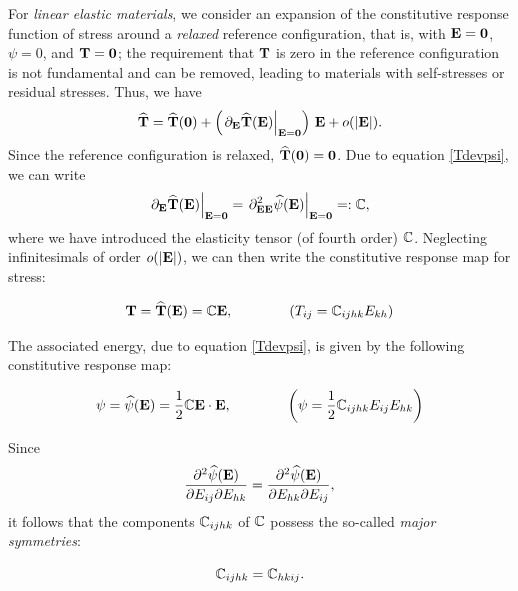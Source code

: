 For \textit{linear elastic materials}, we consider an expansion of the constitutive response function of stress around a \textit{relaxed} reference configuration, that is, with $\mathbf{E} = \mathbf{0}$, $\psi = 0$, and $\mathbf{T} = \mathbf{0}$; the requirement that $\mathbf{T}$ is zero in the reference configuration is not fundamental and can be removed, leading to materials with self-stresses or residual stresses. Thus, we have
\begin{equation}
	\widehat{\mathbf{T}} = \widehat{\mathbf{T}}(\mathbf{0}) + \left(\left.\partial_{\mathbf{E}} \widehat{\mathbf{T}}(\mathbf{E})\right|_{\mathbf{E} = \mathbf{0}}\right)\,\mathbf{E} + o(|\mathbf{E}|).
\end{equation}
Since the reference configuration is relaxed, $\widehat{\mathbf{T}}(\mathbf{0}) = \mathbf{0}$. Due to equation \eqref{Tdevpsi}, we can write
\begin{equation}
	\left.\partial_{\mathbf{E}} \widehat{\mathbf{T}}(\mathbf{E})\right|_{\mathbf{E} = \mathbf{0}} = \left.\partial^2_{\mathbf{E} \mathbf{E}} \widehat{\psi}(\mathbf{E})\right|_{\mathbf{E} = \mathbf{0}} =: \mathbb{C},
\end{equation}
where we have introduced the elasticity tensor (of fourth order) $\mathbb{C}$. Neglecting infinitesimals of order $o(|\mathbf{E}|)$, we can then write the constitutive response map for stress:
\begin{definition}
	\begin{equation}
		\mathbf{T} = \widehat{\mathbf{T}}(\mathbf{E}) = \mathbb{C} \mathbf{E}, \qquad \qquad (T_{ij} = \mathbb{C}_{ijhk} E_{kh})
	\end{equation}
\end{definition}
The associated energy, due to equation \eqref{Tdevpsi}, is given by the following constitutive response map:
\begin{definition}
	\begin{equation}
		\psi = \widehat{\psi}(\mathbf{E}) = \frac{1}{2} \mathbb{C} \mathbf{E} \cdot \mathbf{E}, \qquad \qquad \left(\psi = \frac{1}{2} \mathbb{C}_{ijhk} E_{ij} E_{hk} \right)
	\end{equation}
\end{definition}

Since
\begin{equation}
	\frac{\partial^2 \widehat{\psi}(\mathbf{E})}{\partial E_{ij} \partial E_{hk}} = \frac{\partial^2 \widehat{\psi}(\mathbf{E})}{\partial E_{hk} \partial E_{ij}},
\end{equation}
it follows that the components $\mathbb{C}_{ijhk}$ of $\mathbb{C}$ possess the so-called \textit{major symmetries}:
\begin{definition}
	\begin{equation}
		\mathbb{C}_{ijhk} = \mathbb{C}_{hkij}.
	\end{equation}
\end{definition}

